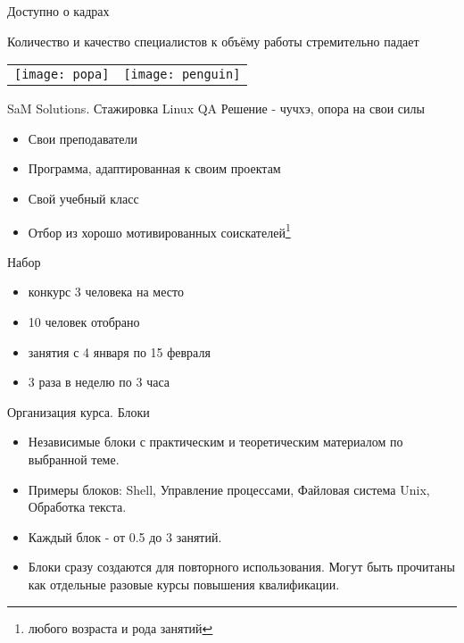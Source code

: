 \begin{frame}[fragile]{Доступно о кадрах}
 
  \begin{center}
    \Large \alert{Количество и качество \newline специалистов к объёму работы \newline стремительно падает} 
  \end{center}
  \begin{tabular}{l r}
    \texttt{[image: popa]} &
    \texttt{[image: penguin]} \\
  \end{tabular}

\end{frame}

\begin{frame}{SaM Solutions. Стажировка Linux QA}
  \alert{Решение - чучхэ, опора на свои силы}

  \begin{itemize}
    \item Свои преподаватели
    \item Программа, адаптированная к своим проектам
    \item Свой учебный класс
    \item Отбор из хорошо мотивированных соискателей\footnote{любого возраста и рода занятий}
  \end{itemize} \pause


  \alert{Набор}
  \begin{itemize}
    \item конкурс 3 человека на место
    \item 10 человек отобрано
    \item занятия с 4 января по 15 февраля
    \item 3 раза в неделю по 3 часа
  \end{itemize}

\end{frame}

\begin{frame}{Организация курса. Блоки}
  
  \begin{itemize}
    \item Независимые блоки с практическим и теоретическим материалом по выбранной теме.
    \item Примеры блоков: Shell, Управление процессами, Файловая система Unix, Обработка текста.
    \item Каждый блок - от 0.5 до 3 занятий.
    \item Блоки сразу создаются для повторного использования.  \newline
      Могут быть прочитаны как отдельные разовые курсы повышения квалификации.
  \end{itemize}

\end{frame}

